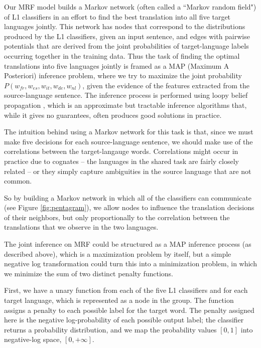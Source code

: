 \documentclass[11pt,letterpaper]{article}
\begin{document}
Our MRF model builds a Markov network (often called a ``Markov random
field") of L1 classifiers in an effort to find the best translation into
all five target languages jointly. This network has nodes that correspond to
the distributions produced by the L1 classifiers, given an input
sentence, and edges with pairwise potentials that are derived from the joint
probabilities of target-language labels occurring together in the training
data. 
Thus the task of finding the optimal translations into five languages jointly
is framed as a MAP (Maximum A Posteriori) inference problem, where we try to
maximize the joint probability $P(w_{fr},w_{es},w_{it},w_{de},w_{nl})$, given
the evidence of the features extracted from the source-language sentence. The
inference process is performed using loopy belief propagation
\cite{DBLP:conf/uai/MurphyWJ99}, which is an approximate but tractable
inference algorithms that, while it gives no guarantees, often produces good
solutions in practice.

The intuition behind using a Markov network for this task is that, since we
must make five decisions for each source-language sentence, we should make use
of the correlations between the target-langauge words. Correlations might occur
in practice due to cognates -- the languages in the shared task are fairly
closely related -- or they simply capture ambiguities in the source language
that are not common.

So by building a Markov network in which all of the classifiers can
communicate (see Figure \ref{fig:pentagram}), we allow nodes to influence the
translation decisions of their neighbors, but only proportionally to the
correlation between the translations that we observe in the two languages.

The joint inference on MRF could be structured as a MAP inference process (as described above),
which is a maximization problem by itself, but a simple negative log transformation could turn this into
a minimization problem, in which we minimize the sum of two distinct penalty functions.

First, we have a unary function from each of the five L1 classifiers and for
each target language, which is represented as a node in the group.  The
function assigns a penalty to each possible label for the target word.  The
penalty assigned here is the negative log-probability of each possible output
label; the classifier returns a probability distribution, and we map the
probability values $[0,1]$ into negative-log space, $[0, +\infty]$.
\end{document}
